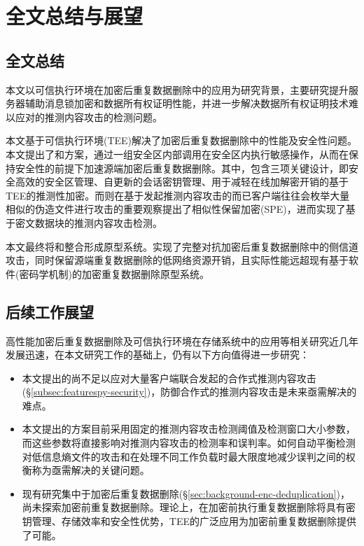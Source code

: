\chapter{全文总结与展望}

\section{全文总结}

本文以可信执行环境在加密后重复数据删除中的应用为研究背景，主要研究提升服务器辅助消息锁加密和数据所有权证明性能，并进一步解决数据所有权证明技术难以应对的推测内容攻击的检测问题。

本文基于可信执行环境(TEE)解决了加密后重复数据删除中的性能及安全性问题。本文提出了\sysnameS 和\sysnameF 方案，通过一组安全区内部调用在安全区内执行敏感操作，从而在保持安全性的前提下加速源端加密后重复数据删除。其中，\sysnameS 包含三项关键设计，即安全高效的安全区管理、自更新的会话密钥管理、用于减轻在线加解密开销的基于TEE的推测性加密。而\sysnameF 则在基于发起推测内容攻击的而已客户端往往会枚举大量相似的伪造文件进行攻击的重要观察提出了相似性保留加密(SPE)，进而实现了基于密文数据块的推测内容攻击检测。

本文最终将\sysnameS 和\sysnameF 整合形成\prototype 原型系统。实现了完整对抗加密后重复数据删除中的侧信道攻击，同时保留源端重复数据删除的低网络资源开销，且实际性能远超现有基于软件(密码学机制)的加密重复数据删除原型系统。

\section{后续工作展望}

高性能加密后重复数据删除及可信执行环境在存储系统中的应用等相关研究近几年发展迅速，在本文研究工作的基础上，仍有以下方向值得进一步研究：

\begin{itemize}
    \item 本文提出的\sysnameF 尚不足以应对大量客户端联合发起的合作式推测内容攻击(\S\ref{subsec:featurespy-security})，防御合作式的推测内容攻击是未来亟需解决的难点。
    \item 本文提出的\sysnameF 方案目前采用固定的推测内容攻击检测阈值及检测窗口大小参数，而这些参数将直接影响对推测内容攻击的检测率和误判率。如何自动平衡检测对低信息熵文件的攻击和在处理不同工作负载时最大限度地减少误判之间的权衡称为亟需解决的关键问题。
    \item 现有研究集中于加密后重复数据删除(\S\ref{sec:background-enc-deduplication})，尚未探索加密前重复数据删除。理论上，在加密前执行重复数据删除将具有密钥管理、存储效率和安全性优势，TEE的广泛应用为加密前重复数据删除提供了可能。
\end{itemize}
